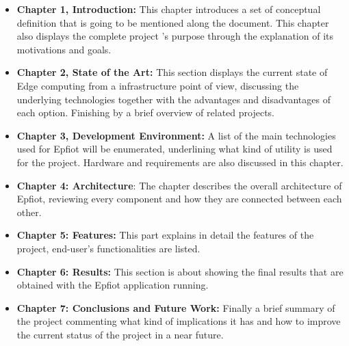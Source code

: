 \begin{itemize}
  \item \textbf{Chapter 1, Introduction:} This chapter introduces a set of conceptual definition that is going to be mentioned along the document. This chapter also displays the complete project 's purpose through the explanation of its motivations and goals.
  \item \textbf{Chapter 2, State of the Art:} This section displays the current state of Edge computing from a infrastructure point of view, discussing the underlying technologies together with the advantages and disadvantages of each option. Finishing by a brief overview of related projects.
  \item \textbf{Chapter 3, Development Environment:} A list of the main technologies used for Epfiot will be enumerated, underlining what kind of utility is used for the project. Hardware and requirements are also discussed in this chapter.
  \item \textbf{Chapter 4: Architecture}: The chapter describes the overall architecture of Epfiot, reviewing every component and how they are connected between each other. 
  \item \textbf{Chapter 5: Features:} This part explains in detail the features of the project, end-user's functionalities are listed.   
  \item \textbf{Chapter 6: Results:} This section is about showing the final results that are obtained with the Epfiot application running. 
  \item \textbf{Chapter 7: Conclusions and Future Work:} Finally a brief summary of the project commenting what kind of implications it has and how to improve the current status of the project in a near future. 
\end{itemize}


